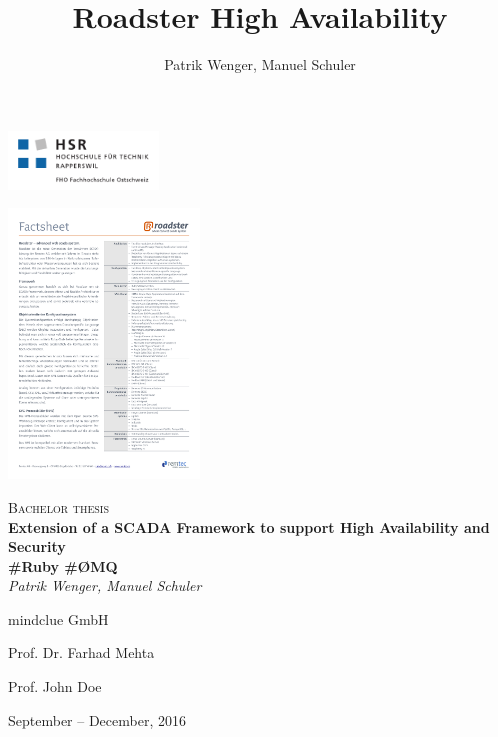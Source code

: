 \documentclass[a4paper]{report}
\title{Roadster High Availability}
\author{Patrik Wenger, Manuel Schuler}
\begin{document}


\thispagestyle{empty}

\begin{titlepage}
\centering
\begin{raggedleft}\includegraphics[trim=10 10 10 10, clip=true, width=0.3\textwidth]{img/hsr_logo.pdf}\end{raggedleft}
\begin{raggedright}\hfill\includegraphics[trim=14.8cm 27cm 1cm 1.4cm, clip=true, width=0.38\textwidth]{img/roadster_factsheet.pdf}\end{raggedright}

\vspace{50mm}
{\scshape\Large Bachelor thesis\\}
\vspace{2cm}
{\huge\bfseries Extension of a SCADA Framework to support High Availability and Security\\}
\vspace{1cm}
{\huge\bfseries \#Ruby \#\O{}MQ\\}
\vspace{2cm}
{\Large\itshape Patrik Wenger, Manuel Schuler\\}
\vfill
\begin{center}
\begin{varwidth}{\textwidth}
\begin{description}
	\large
	\item [client:] mindclue GmbH
	\item [supervisor:] Prof. Dr. Farhad Mehta
	\item [expert:] Prof. John Doe %
\end{description}
\end{varwidth}
\end{center}
\vfill
{\large September -- December, 2016\\}
\end{titlepage}
\end{document}
